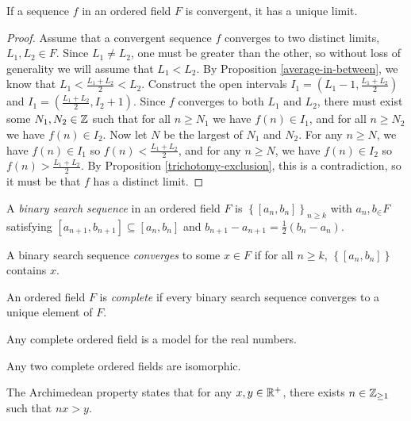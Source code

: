 \begin{thm}
    If a sequence $f$ in an ordered field $F$ is convergent, it has a unique limit.
\end{thm}

\begin{proof}
    Assume that a convergent sequence $f$ converges to two distinct limits, $L_1, L_2 \in F$. Since $L_1 \neq L_2$, one must be greater than the other, so without loss of generality we will assume that $L_1 < L_2$. By Proposition \ref{average-in-between}, we know that $L_1 < \frac{L_1+L_2}{2} < L_2$. Construct the open intervals $I_1 = (L_1 - 1, \frac{L_1+L_2}{2})$ and $I_1 = (\frac{L_1+L_2}{2}, I_2 + 1)$. Since $f$ converges to both $L_1$ and $L_2$, there must exist some $N_1, N_2 \in \mathbb{Z}$ such that for all $n \geq N_1$ we have $f(n) \in I_1$, and for all $n \geq N_2$ we have $f(n) \in I_2$. Now let $N$ be the largest of $N_1$ and $N_2$. For any $n \geq N$, we have $f(n) \in I_1$ so $f(n) < \frac{L_1+L_2}{2}$, and for any $n \geq N$, we have $f(n) \in I_2$ so $f(n) > \frac{L_1+L_2}{2}$. By Proposition \ref{trichotomy-exclusion}, this is a contradiction, so it must be that $f$ has a distinct limit.
\end{proof}

\begin{defn}
    A \emph{binary search sequence} in an ordered field $F$ is $\left\{[a_n, b_n]\right\}_{n \geq k}$ with $a_n, b_ \in F$ satisfying $[a_{n+1}, b_{n+1}] \subseteq [a_n, b_n]$ and $b_{n+1}-a_{n+1} = \frac{1}{2}(b_n - a_n)$.
\end{defn}

\begin{defn}
    A binary search sequence \emph{converges} to some $x \in F$ if for all $n \geq k$, $\left\{[a_n, b_n]\right\}$ contains $x$.
\end{defn}

\begin{defn}
    An ordered field $F$ is \emph{complete} if every binary search sequence converges to a unique element of $F$.
\end{defn}

\begin{defn}
    Any complete ordered field is a model for the real numbers.
\end{defn}

\begin{rmk}
    Any two complete ordered fields are isomorphic.
\end{rmk}

\begin{thm}\label{archimedean-property}
    The Archimedean property states that for any $x, y \in \mathbb{R}^{+}$, there exists $n \in \mathbb{Z}_{\geq 1}$ such that $nx > y$.
\end{thm}

